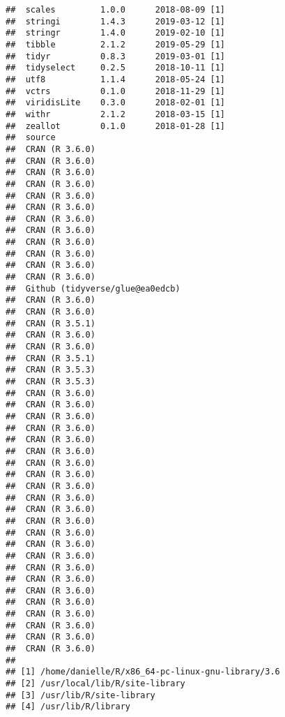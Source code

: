\begin{verbatim}
##  scales         1.0.0      2018-08-09 [1]
##  stringi        1.4.3      2019-03-12 [1]
##  stringr        1.4.0      2019-02-10 [1]
##  tibble         2.1.2      2019-05-29 [1]
##  tidyr          0.8.3      2019-03-01 [1]
##  tidyselect     0.2.5      2018-10-11 [1]
##  utf8           1.1.4      2018-05-24 [1]
##  vctrs          0.1.0      2018-11-29 [1]
##  viridisLite    0.3.0      2018-02-01 [1]
##  withr          2.1.2      2018-03-15 [1]
##  zeallot        0.1.0      2018-01-28 [1]
##  source                         
##  CRAN (R 3.6.0)                 
##  CRAN (R 3.6.0)                 
##  CRAN (R 3.6.0)                 
##  CRAN (R 3.6.0)                 
##  CRAN (R 3.6.0)                 
##  CRAN (R 3.6.0)                 
##  CRAN (R 3.6.0)                 
##  CRAN (R 3.6.0)                 
##  CRAN (R 3.6.0)                 
##  CRAN (R 3.6.0)                 
##  CRAN (R 3.6.0)                 
##  CRAN (R 3.6.0)                 
##  Github (tidyverse/glue@ea0edcb)
##  CRAN (R 3.6.0)                 
##  CRAN (R 3.6.0)                 
##  CRAN (R 3.5.1)                 
##  CRAN (R 3.6.0)                 
##  CRAN (R 3.6.0)                 
##  CRAN (R 3.5.1)                 
##  CRAN (R 3.5.3)                 
##  CRAN (R 3.5.3)                 
##  CRAN (R 3.6.0)                 
##  CRAN (R 3.6.0)                 
##  CRAN (R 3.6.0)                 
##  CRAN (R 3.6.0)                 
##  CRAN (R 3.6.0)                 
##  CRAN (R 3.6.0)                 
##  CRAN (R 3.6.0)                 
##  CRAN (R 3.6.0)                 
##  CRAN (R 3.6.0)                 
##  CRAN (R 3.6.0)                 
##  CRAN (R 3.6.0)                 
##  CRAN (R 3.6.0)                 
##  CRAN (R 3.6.0)                 
##  CRAN (R 3.6.0)                 
##  CRAN (R 3.6.0)                 
##  CRAN (R 3.6.0)                 
##  CRAN (R 3.6.0)                 
##  CRAN (R 3.6.0)                 
##  CRAN (R 3.6.0)                 
##  CRAN (R 3.6.0)                 
##  CRAN (R 3.6.0)                 
##  CRAN (R 3.6.0)                 
##  CRAN (R 3.6.0)                 
## 
## [1] /home/danielle/R/x86_64-pc-linux-gnu-library/3.6
## [2] /usr/local/lib/R/site-library
## [3] /usr/lib/R/site-library
## [4] /usr/lib/R/library
\end{verbatim}

\begin{Shaded}
\begin{Highlighting}[]
\NormalTok{(}\NormalTok{)}
\end{Highlighting}
\end{Shaded}

